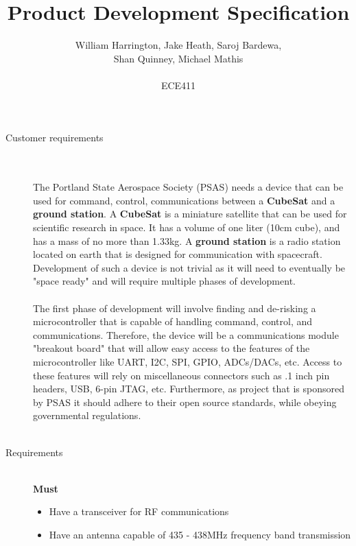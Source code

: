 \documentclass[12pt]{article}
\begin{document}
\title{Product Development Specification}%
\author{William Harrington, Jake Heath, Saroj Bardewa,\\ Shan Quinney, Michael Mathis\\ \\ %
ECE411} %

\maketitle
 \small
\begin{description}
	\item[Customer requirements] \hfill \\ \\
		The Portland State Aerospace Society (PSAS) needs a device that can be used for command, control, communications between a \textbf{CubeSat} and a \textbf{ground station}.
		A \textbf{CubeSat} is a miniature satellite that can be used for scientific research in space. It has a volume of one liter (10cm cube), and has a mass of no more than 1.33kg.
		A \textbf{ground station} is a radio station located on earth that is designed for communication with spacecraft.
		Development of such a device is not trivial as it will need to eventually be "space ready" and will require multiple phases of development. \hfill \\ \\
		The first phase of development will involve finding and de-risking a microcontroller that is capable of handling command, control, and communications.
		Therefore, the device will be a communications module "breakout board" that will allow easy access to the features of the microcontroller like UART, I2C, SPI, GPIO, ADCs/DACs, etc. Access to these features will rely on miscellaneous connectors such as .1 inch pin headers, USB, 6-pin JTAG, etc. Furthermore, as project that is sponsored by PSAS it should adhere to their open source standards, while obeying governmental regulations.
		\hfill \\ \\
		\newpage
	\item[Requirements] \hfill \\
		\textbf{Must}
		\begin{itemize}
			\item{Have a transceiver for RF communications}
      			\item{Have an antenna capable of 435 - 438MHz frequency band transmission}

\end{itemize}
\end{description}
\end{document}
